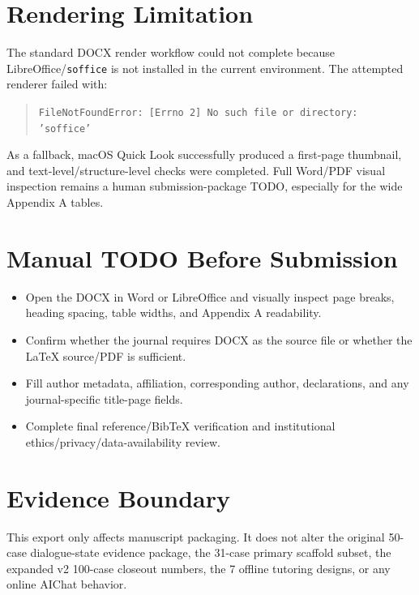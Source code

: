 \documentclass[11pt]{article}
\begin{document}
\section*{Rendering Limitation}

The standard DOCX render workflow could not complete because LibreOffice/\texttt{soffice} is not installed in the current environment. The attempted renderer failed with:
\begin{quote}
\texttt{FileNotFoundError: [Errno 2] No such file or directory: 'soffice'}
\end{quote}
As a fallback, macOS Quick Look successfully produced a first-page thumbnail, and text-level/structure-level checks were completed. Full Word/PDF visual inspection remains a human submission-package TODO, especially for the wide Appendix A tables.

\section*{Manual TODO Before Submission}

\begin{itemize}
\item Open the DOCX in Word or LibreOffice and visually inspect page breaks, heading spacing, table widths, and Appendix A readability.
\item Confirm whether the journal requires DOCX as the source file or whether the \LaTeX{} source/PDF is sufficient.
\item Fill author metadata, affiliation, corresponding author, declarations, and any journal-specific title-page fields.
\item Complete final reference/BibTeX verification and institutional ethics/privacy/data-availability review.
\end{itemize}

\section*{Evidence Boundary}

This export only affects manuscript packaging. It does not alter the original 50-case dialogue-state evidence package, the 31-case primary scaffold subset, the expanded v2 100-case closeout numbers, the 7 offline tutoring designs, or any online AIChat behavior.
\end{document}
